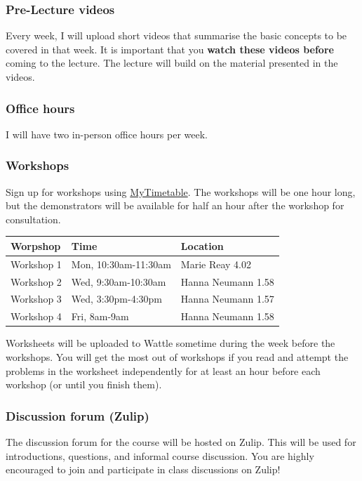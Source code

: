 \documentclass{amsart}
\begin{document}
\subsubsection{Pre-Lecture videos}
\label{sec:org75135d8}
Every week, I will upload short videos that summarise the basic concepts to be covered in that week.
It is important that you \textbf{watch these videos before} coming to the lecture.
The lecture will build on the material presented in the videos.
\subsubsection{Office hours}
\label{sec:org2f3f834}
I will have two in-person office hours per week.
\subsubsection{Workshops}
\label{sec:orgafe2bcd}
Sign up for workshops using \href{https://services.anu.edu.au/information-technology/software-systems/mytimetable}{MyTimetable}.
The workshops will be one hour long, but the demonstrators will be available for half an hour after the workshop for consultation.

\begin{center}
\begin{tabular}{lll}
Worpshop & Time & Location\\
\hline
Workshop 1 & Mon, 10:30am-11:30am & Marie Reay 4.02\\
Workshop 2 & Wed, 9:30am-10:30am & Hanna Neumann 1.58\\
Workshop 3 & Wed, 3:30pm-4:30pm & Hanna Neumann 1.57\\
Workshop 4 & Fri, 8am-9am & Hanna Neumann 1.58\\
\end{tabular}
\end{center}

Worksheets will be uploaded to Wattle sometime during the week before the workshops. You will get the most out of workshops if you read and attempt the problems in the worksheet independently for at least an hour before each workshop (or until you finish them). 
\subsubsection{Discussion forum (Zulip)}
\label{sec:org77887eb}
The discussion forum for the course will be hosted on Zulip. This will be used for introductions, questions, and informal course discussion.
You are highly encouraged to join and participate in class discussions on Zulip!
\end{document}
